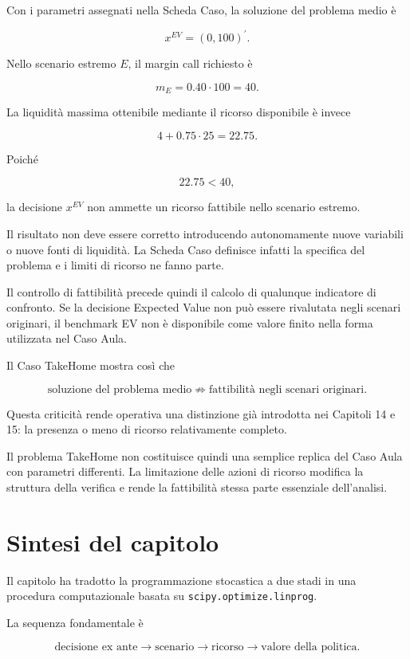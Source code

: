 Con i parametri assegnati nella Scheda Caso, la soluzione del problema medio
\`e

\[
x^{EV}
=
(0,100)^{\prime}.
\]

Nello scenario estremo \(E\), il margin call richiesto \`e

\[
m_E
=
0.40\cdot 100
=
40.
\]

La liquidit\`a massima ottenibile mediante il ricorso disponibile \`e invece

\[
4
+
0.75\cdot 25
=
22.75.
\]

Poich\'e

\[
22.75<40,
\]

\noindent la decisione \(x^{EV}\) non ammette un ricorso fattibile nello
scenario estremo.

Il risultato non deve essere corretto introducendo autonomamente nuove
variabili o nuove fonti di liquidit\`a. La Scheda Caso definisce infatti la
specifica del problema e i limiti di ricorso ne fanno parte.

Il controllo di fattibilit\`a precede quindi il calcolo di qualunque indicatore
di confronto. Se la decisione Expected Value non pu\`o essere rivalutata negli
scenari originari, il benchmark EV non \`e disponibile come valore finito
nella forma utilizzata nel Caso Aula.

Il Caso TakeHome mostra cos\`i che

\[
\text{soluzione del problema medio}
\not\Rightarrow
\text{fattibilit\`a negli scenari originari}.
\]

Questa criticit\`a rende operativa una distinzione gi\`a introdotta nei
Capitoli 14 e 15: la presenza o meno di ricorso relativamente completo.

Il problema TakeHome non costituisce quindi una semplice replica del Caso
Aula con parametri differenti. La limitazione delle azioni di ricorso modifica
la struttura della verifica e rende la fattibilit\`a stessa parte essenziale
dell'analisi.

\section{Sintesi del capitolo}

Il capitolo ha tradotto la programmazione stocastica a due stadi in una
procedura computazionale basata su \texttt{scipy.optimize.linprog}.

La sequenza fondamentale \`e

\[
\text{decisione ex ante}
\longrightarrow
\text{scenario}
\longrightarrow
\text{ricorso}
\longrightarrow
\text{valore della politica}.
\]

